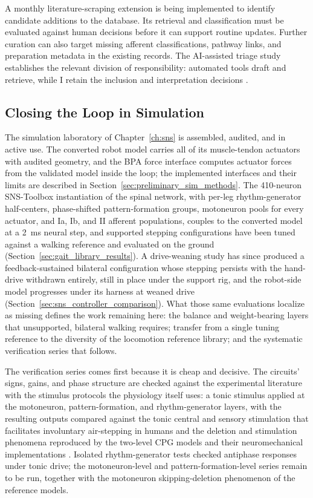A monthly literature-scraping extension is being implemented to identify candidate additions to the database. Its retrieval and classification must be evaluated against human decisions before it can support routine updates. Further curation can also target missing afferent classifications, pathway links, and preparation metadata in the existing records. The AI-assisted triage study establishes the relevant division of responsibility: automated tools draft and retrieve, while I retain the inclusion and interpretation decisions \citep{bolen_using_2024}.

\subsection{Closing the Loop in Simulation}\label{sec:fw_pipeline}\label{sec:fw_cpg}

The simulation laboratory of Chapter~\ref{ch:sns} is assembled, audited, and in active use. The converted robot model carries all of its muscle-tendon actuators with audited geometry, and the BPA force interface computes actuator forces from the validated model inside the loop; the implemented interfaces and their limits are described in Section~\ref{sec:preliminary_sim_methods}. The 410-neuron SNS-Toolbox instantiation of the spinal network, with per-leg rhythm-generator half-centers, phase-shifted pattern-formation groups, motoneuron pools for every actuator, and Ia, Ib, and II afferent populations, couples to the converted model at a \qty{2}{\milli\second} neural step, and supported stepping configurations have been tuned against a walking reference and evaluated on the ground (Section~\ref{sec:gait_library_results}). A drive-weaning study has since produced a feedback-sustained bilateral configuration whose stepping persists with the hand-drive withdrawn entirely, still in place under the support rig, and the robot-side model progresses under its harness at weaned drive (Section~\ref{sec:sns_controller_comparison}). What those same evaluations localize as missing defines the work remaining here: the balance and weight-bearing layers that unsupported, bilateral walking requires; transfer from a single tuning reference to the diversity of the locomotion reference library; and the systematic verification series that follows.

The verification series comes first because it is cheap and decisive. The circuits' signs, gains, and phase structure are checked against the experimental literature with the stimulus protocols the physiology itself uses: a tonic stimulus applied at the motoneuron, pattern-formation, and rhythm-generator layers, with the resulting outputs compared against the tonic central and sensory stimulation that facilitates involuntary air-stepping in humans \citep{selionov_tonic_2009} and the deletion and stimulation phenomena reproduced by the two-level CPG models and their neuromechanical implementations \citep{rybak_modelling_2006, markin_afferent_2010, shevtsova_modeling_2016}. Isolated rhythm-generator tests checked antiphase responses under tonic drive; the motoneuron-level and pattern-formation-level series remain to be run, together with the motoneuron skipping-deletion phenomenon of the reference models.

